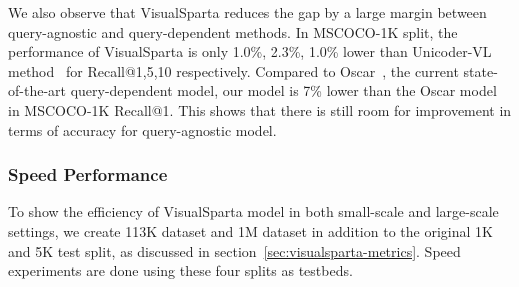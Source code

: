 We also observe that VisualSparta reduces the gap by a large margin between query-agnostic and query-dependent methods. In MSCOCO-1K split, the performance of VisualSparta is only 1.0\%, 2.3\%, 1.0\% lower than Unicoder-VL method~\cite{li2020unicoder} for Recall@1,5,10 respectively. Compared to Oscar~\cite{li2020oscar}, the current state-of-the-art query-dependent model, our model is 7\% lower than the Oscar model in MSCOCO-1K Recall@1. This shows that there is still room for improvement in terms of accuracy for query-agnostic model.






\subsubsection{Speed Performance}
\label{sec:speed-perf}
\begin{table}[ht]
\centering
{}
\caption{\textbf{Model Speed vs. Index Size}: VisualSparta experiments are done under setting top-\textit{n} term scores to 1000. Detailed settings are reported in section \ref{sec:speed-perf}.}
\label{tbl:visualsparta-speed}
\end{table}
To show the efficiency of VisualSparta model in both small-scale and large-scale settings, we create 113K dataset and 1M dataset in addition to the original 1K and 5K test split, as discussed in section~\ref{sec:visualsparta-metrics}. Speed experiments are done using these four splits as testbeds. 


